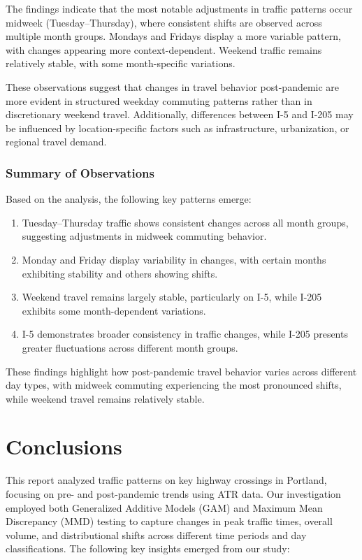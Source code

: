 \documentclass{article}
\begin{document}
The findings indicate that the most notable adjustments in traffic patterns occur midweek (Tuesday–Thursday), where consistent shifts are observed across multiple month groups. Mondays and Fridays display a more variable pattern, with changes appearing more context-dependent. Weekend traffic remains relatively stable, with some month-specific variations.

These observations suggest that changes in travel behavior post-pandemic are more evident in structured weekday commuting patterns rather than in discretionary weekend travel. Additionally, differences between I-5 and I-205 may be influenced by location-specific factors such as infrastructure, urbanization, or regional travel demand.

\subsubsection{Summary of Observations}

Based on the analysis, the following key patterns emerge:

\begin{enumerate}
    \item Tuesday–Thursday traffic shows consistent changes across all month groups, suggesting adjustments in midweek commuting behavior.
    \item Monday and Friday display variability in changes, with certain months exhibiting stability and others showing shifts.
    \item Weekend travel remains largely stable, particularly on I-5, while I-205 exhibits some month-dependent variations.
    \item I-5 demonstrates broader consistency in traffic changes, while I-205 presents greater fluctuations across different month groups.
\end{enumerate}

These findings highlight how post-pandemic travel behavior varies across different day types, with midweek commuting experiencing the most pronounced shifts, while weekend travel remains relatively stable.

\section{Conclusions}

This report analyzed traffic patterns on key highway crossings in Portland, focusing on pre- and post-pandemic trends using ATR data. Our investigation employed both Generalized Additive Models (GAM) and Maximum Mean Discrepancy (MMD) testing to capture changes in peak traffic times, overall volume, and distributional shifts across different time periods and day classifications. The following key insights emerged from our study:
\end{document}
